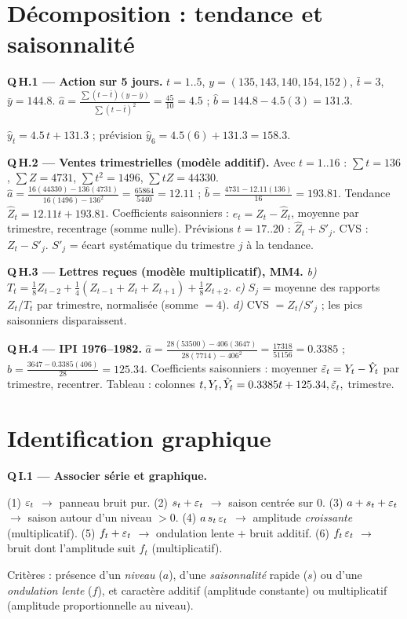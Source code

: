 \documentclass[11pt]{article}
\begin{document}
\section{Décomposition : tendance et saisonnalité}

\textbf{Q\,H.1 --- Action sur 5 jours.}
$t=1..5$, $y=(135,143,140,154,152)$, $\bar t=3$, $\bar y=144.8$.
$\hat a=\frac{\sum(t-\bar t)(y-\bar y)}{\sum(t-\bar t)^2}=\frac{45}{10}=4.5$ ;
$\hat b=144.8-4.5(3)=131.3$.
\begin{reponse}$\hat y_t=4.5\,t+131.3$ ; prévision $\hat y_6=4.5(6)+131.3=158.3$.\end{reponse}

\textbf{Q\,H.2 --- Ventes trimestrielles (modèle additif).}
Avec $t=1..16$ : $\sum t=136$, $\sum Z=4731$, $\sum t^2=1496$, $\sum tZ=44330$.
$\hat a=\frac{16(44330)-136(4731)}{16(1496)-136^2}=\frac{65864}{5440}=12.11$ ;
$\hat b=\frac{4731-12.11(136)}{16}=193.81$. Tendance $\hat Z_t=12.11t+193.81$.
Coefficients saisonniers : $e_t=Z_t-\hat Z_t$, moyenne par trimestre, recentrage (somme nulle).
Prévisions $t=17..20$ : $\hat Z_t+S'_{j}$. CVS : $Z_t-S'_j$. $S'_j$ = écart systématique du
trimestre $j$ à la tendance.

\textbf{Q\,H.3 --- Lettres reçues (modèle multiplicatif), MM4.}
\emph{b)} $T_t=\tfrac18Z_{t-2}+\tfrac14(Z_{t-1}+Z_t+Z_{t+1})+\tfrac18Z_{t+2}$.
\emph{c)} $S_j$ = moyenne des rapports $Z_t/T_t$ par trimestre, normalisée (somme $=4$).
\emph{d)} CVS $=Z_t/S'_j$ ; les pics saisonniers disparaissent.

\textbf{Q\,H.4 --- IPI 1976--1982.}
$\hat a=\frac{28(53500)-406(3647)}{28(7714)-406^2}=\frac{17318}{51156}=0.3385$ ;
$\hat b=\frac{3647-0.3385(406)}{28}=125.34$. Coefficients saisonniers : moyenner
$\tilde{\varepsilon}_t=Y_t-\hat Y_t$ par trimestre, recentrer. Tableau : colonnes $t,Y_t,\hat
Y_t=0.3385t+125.34,\tilde{\varepsilon}_t,$ trimestre.

\section{Identification graphique}

\textbf{Q\,I.1 --- Associer série et graphique.}
\begin{reponse}
(1) $\varepsilon_t$ $\to$ panneau bruit pur. (2) $s_t+\varepsilon_t$ $\to$ saison centrée sur 0.
(3) $a+s_t+\varepsilon_t$ $\to$ saison autour d'un niveau $>0$. (4) $a\,s_t\,\varepsilon_t$ $\to$ amplitude
\emph{croissante} (multiplicatif). (5) $f_t+\varepsilon_t$ $\to$ ondulation lente $+$ bruit additif.
(6) $f_t\,\varepsilon_t$ $\to$ bruit dont l'amplitude suit $f_t$ (multiplicatif).
\end{reponse}
Critères : présence d'un \emph{niveau} ($a$), d'une \emph{saisonnalité} rapide ($s$) ou d'une
\emph{ondulation lente} ($f$), et caractère additif (amplitude constante) ou multiplicatif
(amplitude proportionnelle au niveau).
\end{document}
